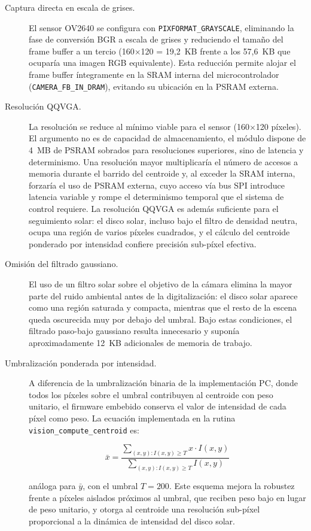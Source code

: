 \begin{description}
\item[Captura directa en escala de grises.] El sensor OV2640 se configura con \texttt{PIXFORMAT\_GRAYSCALE}, eliminando la fase de conversión BGR a escala de grises y reduciendo el tamaño del frame buffer a un tercio (160$\times$120 = 19{,}2~KB frente a los 57{,}6~KB que ocuparía una imagen RGB equivalente). Esta reducción permite alojar el frame buffer íntegramente en la SRAM interna del microcontrolador (\texttt{CAMERA\_FB\_IN\_DRAM}), evitando su ubicación en la PSRAM externa.

\item[Resolución QQVGA.] La resolución se reduce al mínimo viable para el sensor (160$\times$120 píxeles). El argumento no es de capacidad de almacenamiento, el módulo dispone de 4~MB de \gls{PSRAM} sobrados para resoluciones superiores, sino de latencia y determinismo. Una resolución mayor multiplicaría el número de accesos a memoria durante el barrido del centroide y, al exceder la \gls{SRAM} interna, forzaría el uso de PSRAM externa, cuyo acceso vía bus SPI introduce latencia variable y rompe el determinismo temporal que el sistema de control requiere. La resolución \gls{QQVGA} es además suficiente para el seguimiento solar: el disco solar, incluso bajo el filtro de densidad neutra, ocupa una región de varios píxeles cuadrados, y el cálculo del centroide ponderado por intensidad confiere precisión sub-píxel efectiva.

\item[Omisión del filtrado gaussiano.] El uso de un filtro solar sobre el objetivo de la cámara elimina la mayor parte del ruido ambiental antes de la digitalización: el disco solar aparece como una región saturada y compacta, mientras que el resto de la escena queda oscurecida muy por debajo del umbral. Bajo estas condiciones, el filtrado paso-bajo gaussiano resulta innecesario y suponía aproximadamente 12~KB adicionales de memoria de trabajo.

\item[Umbralización ponderada por intensidad.] A diferencia de la umbralización binaria de la implementación PC, donde todos los píxeles sobre el umbral contribuyen al centroide con peso unitario, el firmware embebido conserva el valor de intensidad de cada píxel como peso. La ecuación implementada en la rutina \texttt{vision\_compute\_centroid} es:

	\begin{equation}
        \bar{x} = \frac{\sum_{(x,y) : I(x,y) \geq T} x \cdot I(x,y)}
                       {\sum_{(x,y) : I(x,y) \geq T} I(x,y)}
        \label{eq:centroide_ponderado}
    \end{equation}
    
análoga para $\bar{y}$, con el umbral $T = 200$. Este esquema mejora la robustez frente a píxeles aislados próximos al umbral, que reciben peso bajo en lugar de peso unitario, y otorga al centroide una resolución sub-píxel proporcional a la dinámica de intensidad del disco solar.
\end{description}

